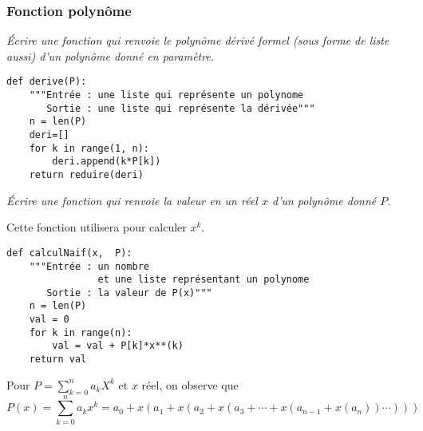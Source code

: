 \subsubsection{Fonction polynôme}
\begin{Exercise}[title=Derivation]\it
Écrire une fonction   qui renvoie le polynôme dérivé formel (sous forme de liste aussi) d'un polynôme donné en paramètre.
\end{Exercise} 
\begin{Answer}
\begin{lstlisting}
def derive(P):
    """Entrée : une liste qui représente un polynome
       Sortie : une liste qui représente la dérivée"""
    n = len(P)
    deri=[]
    for k in range(1, n):
        deri.append(k*P[k])
    return reduire(deri)
\end{lstlisting}
\end{Answer}  
\begin{Exercise}[title=Évaluation]\it 
Écrire une fonction  qui renvoie la valeur en un réel $x$ d'un polynôme donné $P$.

 Cette fonction utilisera  pour calculer $x^k$.
\end{Exercise}
\begin{Answer}
\begin{lstlisting}
def calculNaif(x,  P):
    """Entrée : un nombre 
                et une liste représentant un polynome
       Sortie : la valeur de P(x)"""
    n = len(P)
    val = 0
    for k in range(n):
        val = val + P[k]*x**(k)
    return val
\end{lstlisting}
\end{Answer}  
Pour $P=\sum\limits_{k=0}^n a_kX^k$ et $x$ réel, on observe que 
\[P(x)=\sum_{k=0}^n a_kx^k=a_0+x(a_1+x(a_2+x(a_3+\cdots +x(a_{n-1}+x(a_n))\cdots)))\]


